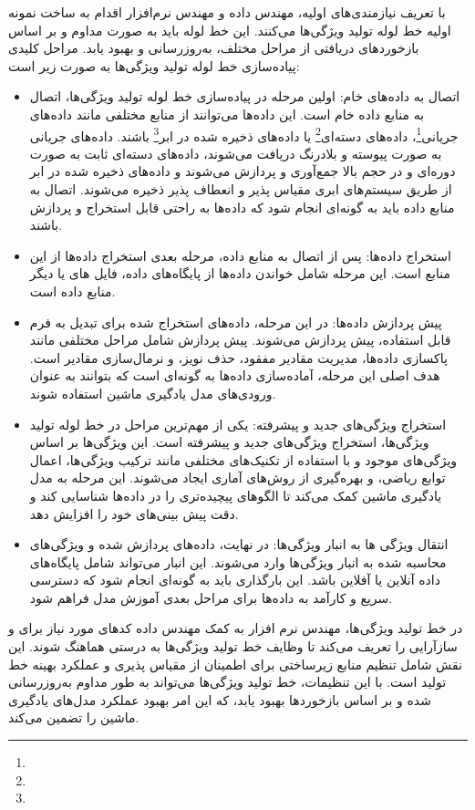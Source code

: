 با تعریف نیازمندی‌های اولیه، مهندس داده و مهندس نرم‌افزار اقدام به ساخت نمونه اولیه خط لوله تولید ویژگی‌ها می‌کنند. این خط لوله باید به صورت مداوم و بر اساس بازخوردهای دریافتی از مراحل مختلف، به‌روزرسانی و بهبود یابد. مراحل کلیدی پیاده‌سازی خط لوله تولید ویژگی‌ها به صورت زیر است:
\begin{itemize}
	\item 
اتصال به داده‌های خام:
اولین مرحله در پیاده‌سازی خط لوله تولید ویژگی‌ها، اتصال به منابع داده خام است. این داده‌ها می‌توانند از منابع مختلفی مانند داده‌های جریانی\footnote{}، داده‌های دسته‌ای\footnote{} یا داده‌های ذخیره شده در ابر\footnote{}  باشند. داده‌های جریانی به صورت پیوسته و بلادرنگ دریافت می‌شوند، داده‌های دسته‌ای ثابت به صورت دوره‌ای و در حجم بالا جمع‌آوری و پردازش می‌شوند و داده‌های ذخیره شده در ابر از طریق سیستم‌های ابری مقیاس پذیر و انعطاف پذیر ذخیره می‌شوند. اتصال به منابع داده باید به گونه‌ای انجام شود که داده‌ها به راحتی قابل استخراج و پردازش باشند.
	\item 
استخراج داده‌ها:
پس از اتصال به منابع داده، مرحله بعدی استخراج داده‌ها از این منابع است. این مرحله شامل خواندن داده‌ها از پایگاه‌های داده، فایل های  یا دیگر منابع داده است. 
	\item 
پیش ‌پردازش داده‌ها:
در این مرحله، داده‌های استخراج شده برای تبدیل به فرم قابل استفاده، پیش ‌پردازش می‌شوند. پیش‌ پردازش شامل مراحل مختلفی مانند پاکسازی داده‌ها، مدیریت مقادیر مفقود، حذف نویز، و نرمال‌سازی مقادیر است. هدف اصلی این مرحله، آماده‌سازی داده‌ها به گونه‌ای است که بتوانند به عنوان ورودی‌های مدل یادگیری ماشین استفاده شوند.
	\item 
استخراج ویژگی‌های جدید و پیشرفته: 
یکی از مهم‌ترین مراحل در خط لوله تولید ویژگی‌ها، استخراج ویژگی‌های جدید و پیشرفته است. این ویژگی‌ها بر اساس ویژگی‌های موجود و با استفاده از تکنیک‌های مختلفی مانند ترکیب ویژگی‌ها، اعمال توابع ریاضی، و بهره‌گیری از روش‌های آماری ایجاد می‌شوند. این مرحله به مدل یادگیری ماشین کمک می‌کند تا الگوهای پیچیده‌تری را در داده‌ها شناسایی کند و دقت پیش ‌بینی‌های خود را افزایش دهد.
	\item 
انتقال ویژگی ‌ها به انبار ویژگی‌ها:
در نهایت، داده‌های پردازش شده و ویژگی‌های محاسبه شده به انبار ویژگی‌ها وارد می‌شوند. این انبار می‌تواند شامل پایگاه‌های داده آنلاین یا آفلاین باشد. این بارگذاری باید به گونه‌ای انجام شود که دسترسی سریع و کارآمد به داده‌ها برای مراحل بعدی آموزش مدل فراهم شود.
\end{itemize}

در خط تولید ویژگی‌ها، مهندس نرم افزار به کمک مهندس داده کدهای مورد نیاز برای  و سازآرایی را تعریف می‌کند تا وظایف خط تولید ویژگی‌ها به درستی هماهنگ شوند. این نقش شامل تنظیم منابع زیرساختی برای اطمینان از مقیاس پذیری و عملکرد بهینه خط تولید است. با این تنظیمات، خط تولید ویژگی‌ها می‌تواند به طور مداوم به‌روزرسانی شده و بر اساس بازخوردها بهبود یابد، که این امر بهبود عملکرد مدل‌های یادگیری ماشین را تضمین می‌کند.

